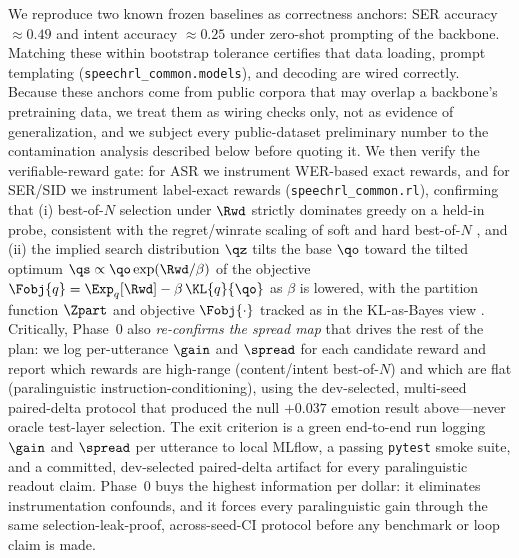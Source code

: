 We reproduce two known frozen baselines as correctness anchors: SER accuracy $\approx 0.49$ and intent accuracy $\approx 0.25$ under zero-shot prompting of the backbone. Matching these within bootstrap tolerance certifies that data loading, prompt templating (\texttt{speechrl\_common.models}), and decoding are wired correctly. Because these anchors come from public corpora that may overlap a backbone's pretraining data, we treat them as wiring checks only, not as evidence of generalization, and we subject every public-dataset preliminary number to the contamination analysis described below before quoting it. We then verify the verifiable-reward gate: for ASR we instrument WER-based exact rewards, and for SER/SID we instrument label-exact rewards (\texttt{speechrl\_common.rl}), confirming that (i) best-of-$N$ selection under $\Rwd$ strictly dominates greedy on a held-in probe, consistent with the regret/winrate scaling of soft and hard best-of-$N$ \citep{verdun2025softbon,beirami2024bon,aminian2025smoothing}, and (ii) the implied search distribution $\qz$ tilts the base $\qo$ toward the tilted optimum $\qs \propto \qo \exp(\Rwd/\beta)$ of the objective $\Fobj{q} = \Exp_q[\Rwd] - \beta\,\KL{q}{\qo}$ as $\beta$ is lowered, with the partition function $\Zpart$ and objective $\Fobj{\cdot}$ tracked as in the KL-as-Bayes view \citep{korbak2022kl}. Critically, Phase~0 also \emph{re-confirms the spread map} that drives the rest of the plan: we log per-utterance $\gain$ and $\spread$ for each candidate reward and report which rewards are high-range (content/intent best-of-$N$) and which are flat (paralinguistic instruction-conditioning), using the dev-selected, multi-seed paired-delta protocol that produced the null $+0.037$ emotion result above---never oracle test-layer selection. The exit criterion is a green end-to-end run logging $\gain$ and $\spread$ per utterance to local MLflow, a passing \texttt{pytest} smoke suite, and a committed, dev-selected paired-delta artifact for every paralinguistic readout claim. Phase~0 buys the highest information per dollar: it eliminates instrumentation confounds, and it forces every paralinguistic gain through the same selection-leak-proof, across-seed-CI protocol before any benchmark or loop claim is made.

